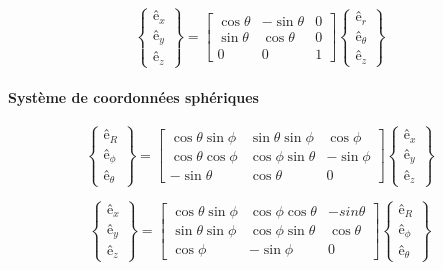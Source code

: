 $$\left\{\begin{array}{c}
\textbf{ê}_x\\
\textbf{ê}_{y}\\
\textbf{ê}_z
\end{array}\right\}=
\left[\begin{array}{ccc}
\cos\theta&-\sin\theta&0\\
\sin\theta&\cos\theta&0\\
0&0&1
\end{array}\right]
\left\{\begin{array}{c}
\textbf{ê}_r\\
\textbf{ê}_{\theta}\\
\textbf{ê}_z
\end{array}\right\}$$

\paragraph{Système de coordonnées sphériques}
$$\left\{\begin{array}{c}
\textbf{ê}_R\\
\textbf{ê}_{\phi}\\
\textbf{ê}_{\theta}
\end{array}\right\}=
\left[\begin{array}{ccc}
\cos\theta\sin\phi&\sin\theta\sin\phi&\cos\phi\\
\cos\theta\cos\phi&\cos\phi\sin\theta&-\sin\phi\\
-\sin\theta&\cos\theta&0
\end{array}\right]
\left\{\begin{array}{c}
\textbf{ê}_x\\
\textbf{ê}_y\\
\textbf{ê}_z
\end{array}\right\}$$

$$\left\{\begin{array}{c}
\textbf{ê}_x\\
\textbf{ê}_{y}\\
\textbf{ê}_z
\end{array}\right\}=
\left[\begin{array}{ccc}
\cos\theta\sin\phi&\cos\phi\cos\theta&-sin\theta\\
\sin\theta\sin\phi&\cos\phi\sin\theta&\cos\theta\\
\cos\phi&-\sin\phi&0
\end{array}\right]
\left\{\begin{array}{c}
\textbf{ê}_R\\
\textbf{ê}_{\phi}\\
\textbf{ê}_{\theta}
\end{array}\right\}$$

